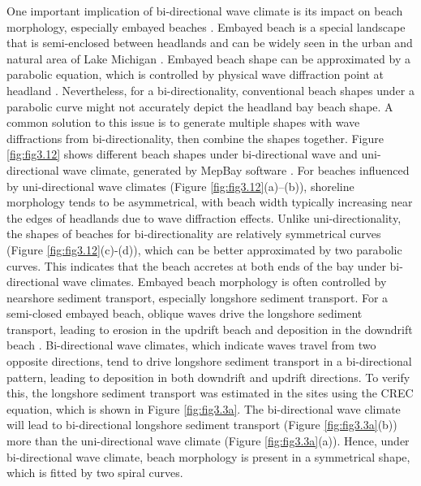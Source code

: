 One important implication of bi-directional wave climate is its impact on beach
morphology, especially embayed beaches
\citep{wiggins_coastal_2019,wiggins_regionally-coherent_2019}. Embayed beach is
a special landscape that is semi-enclosed between headlands and can be widely
seen in the urban and natural area of Lake Michigan \citep{mattheus_great_2022}.
Embayed beach shape can be approximated by a parabolic equation, which is
controlled by physical wave diffraction point at headland
\citep{moreno_equilibrium_1999}. Nevertheless, for a bi-directionality,
conventional beach shapes under a parabolic curve might not accurately depict
the headland bay beach shape. A common solution to this issue is to generate
multiple shapes with wave diffractions from bi-directionality, then combine the
shapes together. Figure \ref{fig:fig3.12} shows different beach shapes under
bi-directional wave and uni-directional wave climate, generated by MepBay
software \citep{da2003visual}. For beaches influenced by uni-directional wave
climates (Figure \ref{fig:fig3.12}(a)–(b)), shoreline morphology tends to be
asymmetrical, with beach width typically increasing near the edges of headlands
due to wave diffraction effects. Unlike uni-directionality, the shapes of
beaches for bi-directionality are relatively symmetrical curves (Figure
\ref{fig:fig3.12}(c)-(d)), which can be better approximated by two parabolic
curves. This indicates that the beach accretes at both ends of the bay under
bi-directional wave climates. Embayed beach morphology is often controlled by
nearshore sediment transport, especially longshore sediment transport. For a
semi-closed embayed beach, oblique waves drive the longshore sediment transport,
leading to erosion in the updrift beach and deposition in the downdrift beach
\citep{moreno_equilibrium_1999,loureiro_24_2020}. Bi-directional wave climates,
which indicate waves travel from two opposite directions, tend to drive
longshore sediment transport in a bi-directional pattern, leading to deposition
in both downdrift and updrift directions. To verify this, the longshore sediment
transport was estimated in the sites using the CREC equation, which is shown in
Figure \ref{fig:fig3.3a}. The bi-directional wave climate will lead to
bi-directional longshore sediment transport (\eg Figure \ref{fig:fig3.3a}(b))
more than the uni-directional wave climate (\eg Figure \ref{fig:fig3.3a}(a)).
Hence, under bi-directional wave climate, beach morphology is present in a
symmetrical shape, which is fitted by two spiral curves. 

